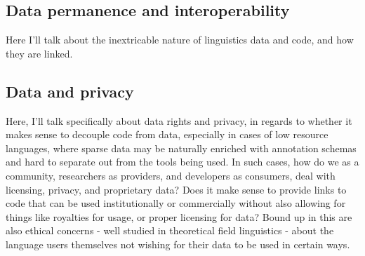 

\subsection{Data permanence and interoperability}

Here I'll talk about the inextricable nature of linguistics data and code, and how they are linked.

\subsection{Data and privacy}
\label{subsec:data-and-privacy}

Here, I'll talk specifically about data rights and privacy, in regards to whether it makes sense to decouple code from data, especially in cases of low resource languages, where sparse data may be naturally enriched with annotation schemas and hard to separate out from the tools being used. In such cases, how do we as a community, researchers as providers, and developers as consumers, deal with licensing, privacy, and proprietary data? Does it make sense to provide links to code that can be used institutionally or commercially without also allowing for things like royalties for usage, or proper licensing for data? Bound up in this are also ethical concerns - well studied in theoretical field linguistics - about the language users themselves not wishing for their data to be used in certain ways.



